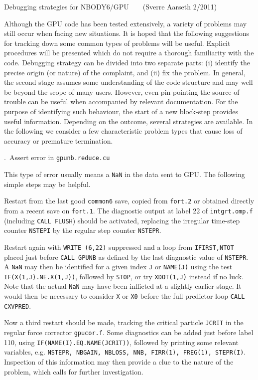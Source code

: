 \documentclass[12pt]{article}
\begin{document}
\centerline {Debugging strategies for NBODY6/GPU~~~~(Sverre Aarseth 2/2011)~~~~~~}
\bigskip
\noindent

Although the GPU code has been tested extensively, a variety of problems may
still occur when facing new situations.
It is hoped that the following suggestions for tracking down some common types of
problems will be useful.
Explicit procedures will be presented which do not require a thorough familiarity
with the code.
Debugging strategy can be divided into two separate parts: (i) identify the
precise origin (or nature) of the complaint, and (ii) fix the problem.
In general, the second stage assumes some understanding of the code structure
and may well be beyond the scope of many users.
However, even pin-pointing the source of trouble can be useful when accompanied
by relevant documentation.
For the purpose of identifying such behaviour, the start of a new block-step 
provides useful information.
Depending on the outcome, several strategies are available.
In the following we consider a few characteristic problem types that cause loss
of accuracy or premature termination.

\bigskip
{}.~Assert error in {\tt gpunb.reduce.cu}

\medskip
This type of error usually means a {\tt NaN} in the data sent to GPU.
The following simple steps may be helpful.

Restart from the last good {\tt common6} save, copied from {\tt fort.2}
or obtained directly from a recent save on {\tt fort.1}.
The diagnostic output at label 22 of {\tt intgrt.omp.f} (including {\tt CALL FLUSH})
should be activated, replacing the irregular time-step counter {\tt NSTEPI} by
the regular step counter {\tt NSTEPR}.

Restart again with {\tt WRITE (6,22)} suppressed and a loop from {\tt IFIRST,NTOT}
placed just before {\tt CALL~GPUNB} as defined by the last diagnostic
value of {\tt NSTEPR}.
A {\tt NaN} may then be identified for a given index {\tt J} or {\tt NAME(J)} using the test
{\tt IF(X(1,J).NE.X(1,J))}, followed by {\tt STOP}, or try {\tt XDOT(1,J)} instead if
no luck.
Note that the actual {\tt NaN} may have been inflicted at a slightly earlier stage.
It would then be necessary to consider {\tt X} or {\tt X0} before the full predictor
loop {\tt CALL CXVPRED}.

Now a third restart should be made, tracking the critical particle {\tt JCRIT} in
the regular force corrector {\tt gpucor.f}.
Some diagnostics can be added just before label 110, using {\tt IF(NAME(I).EQ.NAME(JCRIT))},
followed by printing some relevant variables, e.g.
{\tt NSTEPR, NBGAIN, NBLOSS, NNB, FIRR(1), FREG(1), STEPR(I)}.
Inspection of this information may then provide a clue to the nature of the problem,
which calls for further investigation.
\end{document}
